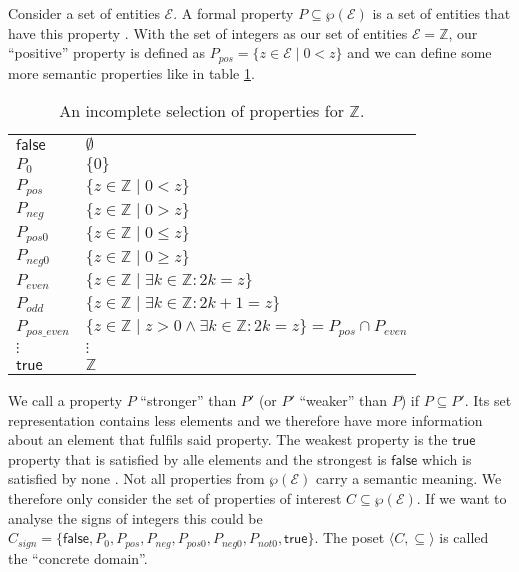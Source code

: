 \documentclass{report}
\begin{document}
Consider a set of entities $\mathcal{E}$. A formal property $P\subseteq \wp(\mathcal{E}) $ is a set of entities that have this property \cite[chapter 8]{cousot2021}. With the set of integers as our set of entities $\mathcal{E}=\mathbb{Z}$, our ``positive'' property is defined as $P_{pos}=\{z\in \mathcal{E} \;|\; 0<z\}$ and we can define some more semantic properties like in table \ref{table:properties}.
\begin{table}[hbt]
\begin{center}
  \begin{tabular}{l|l}
  $\mathsf{false}$ & $\emptyset$\\
   $P_{0}$ & $\{0\}$\\
   $P_{pos}$ & $\{z\in \mathbb{Z} \;|\; 0<z\}$\\
   $P_{neg}$ & $\{z\in \mathbb{Z} \;|\; 0>z\}$\\
   $P_{pos0}$ & $\{z\in \mathbb{Z} \;|\; 0\leq z\}$\\
   $P_{neg0}$ & $\{z\in \mathbb{Z} \;|\; 0\geq z\}$\\
   $P_{even}$ & $\{z\in \mathbb{Z} \;|\; \exists k\in\mathbb{Z}:2k=z \}$ \\
   $P_{odd}$ & $\{z\in \mathbb{Z} \;|\; \exists k\in\mathbb{Z}:2k+1=z \}$ \\
   $P_{pos\_even}$ & $\{z\in \mathbb{Z} \;|\; z>0 \wedge \exists k\in\mathbb{Z}:2k=z \} = P_{pos} \cap P_{even}$ \\
   $\vdots$ &$\vdots$\\
   $\mathsf{true}$ & $\mathbb{Z}$\\
  \end{tabular}
  \caption{An incomplete selection of properties for $\mathbb{Z}$.}\label{table:properties}
  \end{center}
\end{table}

We call a property $P$ ``stronger'' than $P'$ (or $P'$ ``weaker'' than $P$) if $P\subseteq P'$. Its set representation contains less elements and we therefore have more information about an element that fulfils said property. The weakest property is the $\mathsf{true}$ property that is satisfied by alle elements and the strongest is $\mathsf{false}$ which is satisfied by none \cite[chapter 8]{cousot2021}. Not all properties from $\wp(\mathcal{E})$ carry a semantic meaning. We therefore only consider the set of properties of interest $C\subseteq\wp(\mathcal{E})$. If we want to analyse the signs of integers this could be $C_{sign}=\{\mathsf{false}, P_{0}, P_{pos}, P_{neg}, P_{pos0}, P_{neg0}, P_{not0}, \mathsf{true}\}$. The poset  $\langle C,\subseteq\rangle$ is called the ``concrete domain''.
\end{document}
